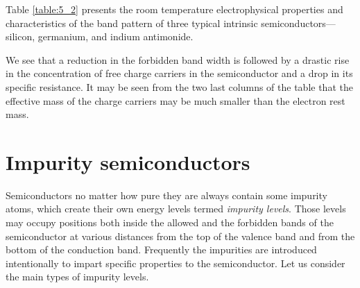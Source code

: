 Table \ref{table:5_2} presents the room temperature electrophysical properties and characteristics of the band pattern of three typical intrinsic semiconductors---silicon, germanium, and indium antimonide.

\begin{table}[!b]
	\renewcommand{\arraystretch}{1.2}
	\caption{}
	\vspace{-0.6cm}
	\label{table:5_2}
	\begin{center}\end{center}
\end{table}

We see that a reduction in the forbidden band width is followed by a drastic rise in the concentration of free charge carriers in the semiconductor and a drop in its specific resistance. It may be seen from the two last columns of the table that the effective mass of the charge carriers may be much smaller than the electron rest mass.

\section{Impurity semiconductors}\label{sec:44}

Semiconductors no matter how pure they are always contain some impurity atoms, which create their own energy levels termed \textit{impurity levels}. Those levels may occupy positions both inside the allowed and the forbidden bands of the semiconductor at various distances from the top of the valence band and from the bottom of the conduction band. Frequently the impurities are introduced intentionally to impart specific properties to the semiconductor. Let us consider the main types of impurity levels.

